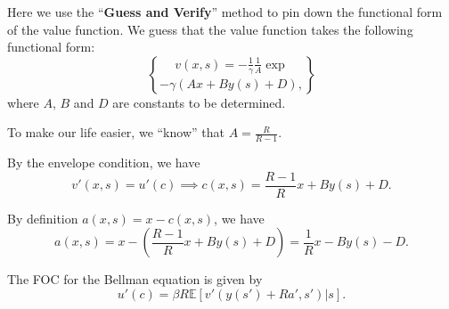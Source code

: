 Here we use the ``\textbf{Guess and Verify}'' method to pin down the functional form of the value function. We guess that the value function takes the following functional form:
\[v(x,s) = -\frac{1}{\gamma}\frac{1}{A}\exp\brace{-\gamma(Ax+By(s)+D)},\]
where $A$, $B$ and $D$ are constants to be determined.

To make our life easier, we ``know'' that $A = \frac{R}{R-1}$.

By the envelope condition, we have
\[
v'(x,s) = u'(c)\implies c(x,s) = \frac{R-1}{R}x+By(s)+D.
\]

By definition $a(x,s) = x - c(x,s)$, we have
\[
a(x,s) = x - \left(\frac{R-1}{R}x+By(s)+D\right) = \frac{1}{R}x - By(s) - D.
\]

The FOC for the Bellman equation is given by
\[
    u'(c) = \beta R \mathbb E[v'(y(s')+Ra',s')|s].
\]

